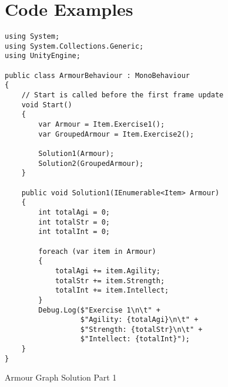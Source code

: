 \chapter{Code Examples} \label{app:terse-diff-comp}
\begin{listing}[H]
\begin{verbatim}
using System;
using System.Collections.Generic;
using UnityEngine;

public class ArmourBehaviour : MonoBehaviour
{
    // Start is called before the first frame update
    void Start()
    {
        var Armour = Item.Exercise1();
        var GroupedArmour = Item.Exercise2();

        Solution1(Armour);
        Solution2(GroupedArmour);
    }

    public void Solution1(IEnumerable<Item> Armour)
    {
        int totalAgi = 0;
        int totalStr = 0;
        int totalInt = 0;

        foreach (var item in Armour)
        {
            totalAgi += item.Agility;
            totalStr += item.Strength;
            totalInt += item.Intellect;
        }
        Debug.Log($"Exercise 1\n\t" +
                  $"Agility: {totalAgi}\n\t" +
                  $"Strength: {totalStr}\n\t" +
                  $"Intellect: {totalInt}");
    }
}

\end{verbatim}
\caption{Armour Graph \cs Solution Part 1}
\label{lst:armour-graph-cs-1}
\end{listing}

